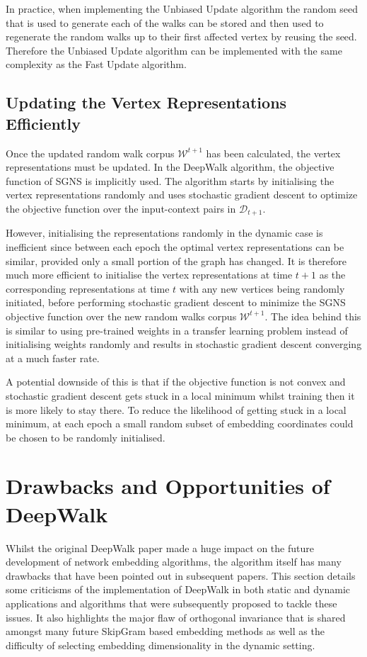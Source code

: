 \documentclass[a4paper]{article}
\newcommand{\D}{\mathcal D}
\newcommand{\W}{\mathcal W}
\begin{document}
In practice, when implementing the Unbiased Update algorithm the random seed
that is used to generate each of the walks can be stored and then used to
regenerate the random walks up to their first affected vertex by reusing the
seed. Therefore the Unbiased Update algorithm can be implemented with the same
complexity as the Fast Update algorithm.

\subsection{Updating the Vertex Representations Efficiently}
Once the updated random walk corpus $\W^{t+1}$ has been calculated, the vertex
representations must be updated. In the DeepWalk algorithm, the objective function of SGNS is implicitly used.
The algorithm starts by initialising the vertex representations randomly and
uses stochastic gradient descent to optimize the objective function over the
input-context pairs in $\D_{t+1}$.

However, initialising the representations randomly in the dynamic case is
inefficient since between each epoch the optimal vertex representations can be similar, provided only a small portion of the graph has changed. It is therefore much more efficient to initialise the vertex
representations at time $t+1$ as the corresponding representations at time $t$
with any new vertices being randomly initiated, before performing stochastic gradient
descent to minimize the SGNS objective function over the new random walks corpus
$\W^{t+1}$. The idea behind this is similar to using pre-trained weights in a transfer
learning problem instead of initialising weights randomly and results in
stochastic gradient descent converging at a much faster rate.

A potential downside of this is that if the objective function is not convex and
stochastic gradient descent gets stuck in a local minimum whilst training then it
is more likely to stay there. To reduce the likelihood of getting stuck in a local
minimum, at each epoch a small random subset of embedding coordinates could be chosen to be randomly initialised.

\section{Drawbacks and Opportunities of DeepWalk}
Whilst the original DeepWalk paper made a huge impact on the future development
of network embedding algorithms, the algorithm itself has many drawbacks that have been pointed out in subsequent papers. This section details some criticisms of the implementation of
DeepWalk in both static and dynamic applications and algorithms that were subsequently proposed to tackle these issues. It also highlights the major flaw of orthogonal invariance that is shared amongst many future SkipGram based embedding methods as well as the difficulty of selecting embedding dimensionality in the dynamic setting.\\
\end{document}
